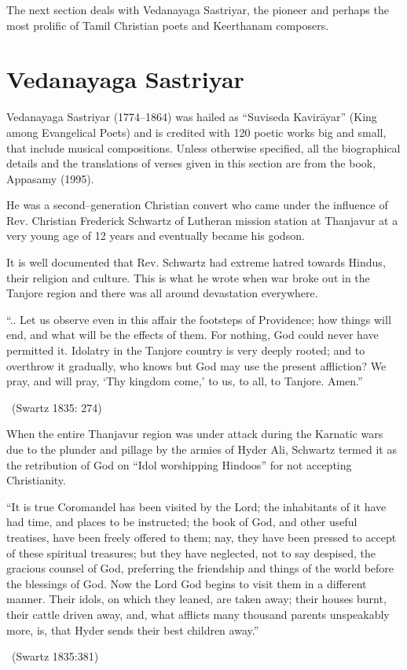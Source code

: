 The next section deals with Vedanayaga Sastriyar, the pioneer and perhaps the most prolific of Tamil Christian poets and Keerthanam composers.


\section*{Vedanayaga Sastriyar}

Vedanayaga Sastriyar (1774–1864) was hailed as “Suviseda Kavirāyar” (King among Evangelical Poets) and is credited with 120 poetic works big and small, that include musical compositions. Unless otherwise specified, all the biographical details and the translations of verses given in this section are from the book, Appasamy (1995).

He was a second–generation Christian convert who came under the influence of Rev. Christian Frederick Schwartz of Lutheran mission station at Thanjavur at a very young age of 12 years and eventually became his godson.

It is well documented that Rev. Schwartz had extreme hatred towards Hindus, their religion and culture. This is what he wrote when war broke out in the Tanjore region and there was all around devastation everywhere.

\begin{myquote}
“.. Let us observe even in this affair the footsteps of Providence; how things will end, and what will be the effects of them. For nothing, God could never have permitted it. Idolatry in the Tanjore country is very deeply rooted; and to overthrow it gradually, who knows but God may use the present affliction? We pray, and will pray, ‘Thy kingdom come,’ to us, to all, to Tanjore. Amen.” 

~\hfill (Swartz 1835: 274)
\end{myquote}

When the entire Thanjavur region was under attack during the Karnatic wars due to the plunder and pillage by the armies of Hyder Ali, Schwartz termed it as the retribution of God on “Idol worshipping Hindoos” for not accepting Christianity.

\begin{myquote}
“It is true Coromandel has been visited by the Lord; the inhabitants of it have had time, and places to be instructed; the book of God, and other useful treatises, have been freely offered to them; nay, they have been pressed to accept of these spiritual treasures; but they have neglected, not to say despised, the gracious counsel of God, preferring the friendship and things of the world before the blessings of God. Now the Lord God begins to visit them in a different manner. Their idols, on which they leaned, are taken away; their houses burnt, their cattle driven away, and, what afflicts many thousand parents unspeakably more, is, that Hyder sends their best children away.” 

~\hfill (Swartz 1835:381)
\end{myquote}

